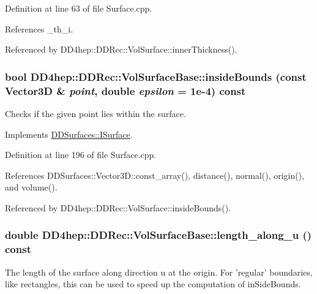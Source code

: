 Definition at line 63 of file Surface.cpp.

References \_\-th\_\-i.

Referenced by DD4hep::DDRec::VolSurface::innerThickness().\hypertarget{class_d_d4hep_1_1_d_d_rec_1_1_vol_surface_base_aae8b494969fd257e4aa3e5b3d80cebb8}{
\subsubsection[{insideBounds}]{\setlength{\rightskip}{0pt plus 5cm}bool DD4hep::DDRec::VolSurfaceBase::insideBounds (const {\bf Vector3D} \& {\em point}, \/  double {\em epsilon} = {\ttfamily 1e-\/4}) const}}
\label{class_d_d4hep_1_1_d_d_rec_1_1_vol_surface_base_aae8b494969fd257e4aa3e5b3d80cebb8}


Checks if the given point lies within the surface. 

Implements \hyperlink{class_d_d_surfaces_1_1_i_surface_a16aa78cb8c01cd5993b7cf23f55a7e3a}{DDSurfaces::ISurface}.

Definition at line 196 of file Surface.cpp.

References DDSurfaces::Vector3D::const\_\-array(), distance(), normal(), origin(), and volume().

Referenced by DD4hep::DDRec::VolSurface::insideBounds().\hypertarget{class_d_d4hep_1_1_d_d_rec_1_1_vol_surface_base_a11c8c2074c8f0e4af494aa6802be9372}{
\subsubsection[{length\_\-along\_\-u}]{\setlength{\rightskip}{0pt plus 5cm}double DD4hep::DDRec::VolSurfaceBase::length\_\-along\_\-u () const}}
\label{class_d_d4hep_1_1_d_d_rec_1_1_vol_surface_base_a11c8c2074c8f0e4af494aa6802be9372}
The length of the surface along direction u at the origin. For 'regular' boundaries, like rectangles, this can be used to speed up the computation of inSideBounds. 

